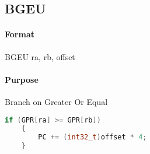 \subsection{BGEU}


\paragraph{Format} BGEU ra, rb, offset

\paragraph{Purpose} Branch on Greater Or Equal

\begin{lstlisting}[language=c]
    if (GPR[ra] >= GPR[rb])
    {
        PC += (int32_t)offset * 4;
    }
\end{lstlisting}
